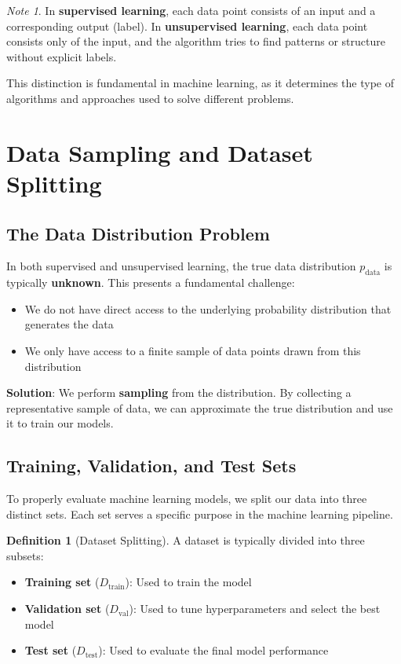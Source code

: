 \documentclass[11pt,a4paper]{article}
\theoremstyle{definition}
\newtheorem{definition}{Definition}[section]
\theoremstyle{plain}
\theoremstyle{remark}
\newtheorem*{remark}{Note}
\begin{document}
\begin{remark}
In \textbf{supervised learning}, each data point consists of an input and a corresponding output (label). In \textbf{unsupervised learning}, each data point consists only of the input, and the algorithm tries to find patterns or structure without explicit labels.

This distinction is fundamental in machine learning, as it determines the type of algorithms and approaches used to solve different problems.
\end{remark}

\section{Data Sampling and Dataset Splitting}

\subsection{The Data Distribution Problem}

In both supervised and unsupervised learning, the true data distribution $p_{\text{data}}$ is typically \textbf{unknown}. This presents a fundamental challenge:
\begin{itemize}
    \item We do not have direct access to the underlying probability distribution that generates the data
    \item We only have access to a finite sample of data points drawn from this distribution
\end{itemize}

\textbf{Solution}: We perform \textbf{sampling} from the distribution. By collecting a representative sample of data, we can approximate the true distribution and use it to train our models.

\subsection{Training, Validation, and Test Sets}

To properly evaluate machine learning models, we split our data into three distinct sets. Each set serves a specific purpose in the machine learning pipeline.

\begin{definition}[Dataset Splitting]
A dataset is typically divided into three subsets:
\begin{itemize}
    \item \textbf{Training set} ($D_{\text{train}}$): Used to train the model
    \item \textbf{Validation set} ($D_{\text{val}}$): Used to tune hyperparameters and select the best model
    \item \textbf{Test set} ($D_{\text{test}}$): Used to evaluate the final model performance
\end{itemize}
\end{definition}
\end{document}
